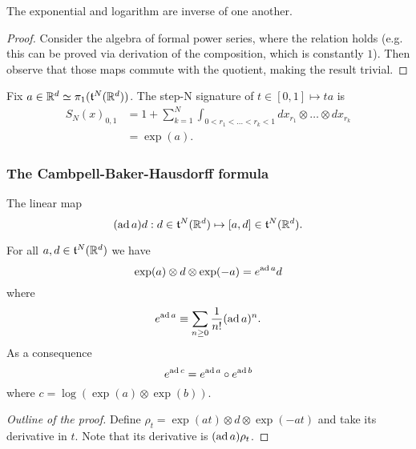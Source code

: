 \begin{lemma}
    The exponential and logarithm are inverse of one another.
\end{lemma}
\begin{proof}
    Consider the algebra of formal power series, where the relation holds (e.g. this can be proved via derivation of the composition, which is constantly \(1\)).
    Then observe that those maps commute with the quotient, making the result trivial.
\end{proof}

\begin{example}
    Fix \(a \in \mathbb{R}^d \simeq \pi_1(\mathfrak{t}^N(\mathbb{R}^d))\). The step-N signature of \(t \in [0,1] \mapsto ta\) is
    \begin{align}
        S_N(x)_{0,1} &= 1 + \sum_{k=1}^N \int_{0 < r_1 < \ldots < r_k < 1} dx_{r_1} \otimes \ldots \otimes dx_{r_k} \\
        &= \exp(a).
    \end{align}
\end{example}

\subsubsection{The Cambpell-Baker-Hausdorff formula}

\begin{definition}[\(\ad\) map]
    The linear map 
    \begin{equation}
        (\operatorname{ad} a) d : d \in \mathfrak{t}^N(\mathbb{R}^d) \mapsto [a,d] \in \mathfrak{t}^N(\mathbb{R}^d).
    \end{equation}
\end{definition}

\begin{lemma}
    For all \(a, d \in \mathfrak{t}^N(\mathbb{R}^d)\) we have
    \begin{equation}
        \exp(a) \otimes d \otimes \exp(-a) = e^{\operatorname{ad} a} d
    \end{equation}
    where
    \begin{equation}
        e^{\operatorname{ad} a} \equiv \sum_{n \ge 0} \frac{1}{n!} (\operatorname{ad} a)^n.
    \end{equation}
    As a consequence 
    \begin{equation}
        e^{\operatorname{ad} c} = e^{\operatorname{ad} a} \circ e^{\operatorname{ad} b}
    \end{equation}
    where \(c = \log(\exp(a) \otimes \exp(b))\).
\end{lemma}
\begin{proof}[Outline of the proof]
    Define \(\rho_t = \exp(at) \otimes d \otimes \exp(-at)\) and take its derivative in \(t\).
    Note that its derivative is \( (\operatorname{ad} a) \rho_t \).
\end{proof}


